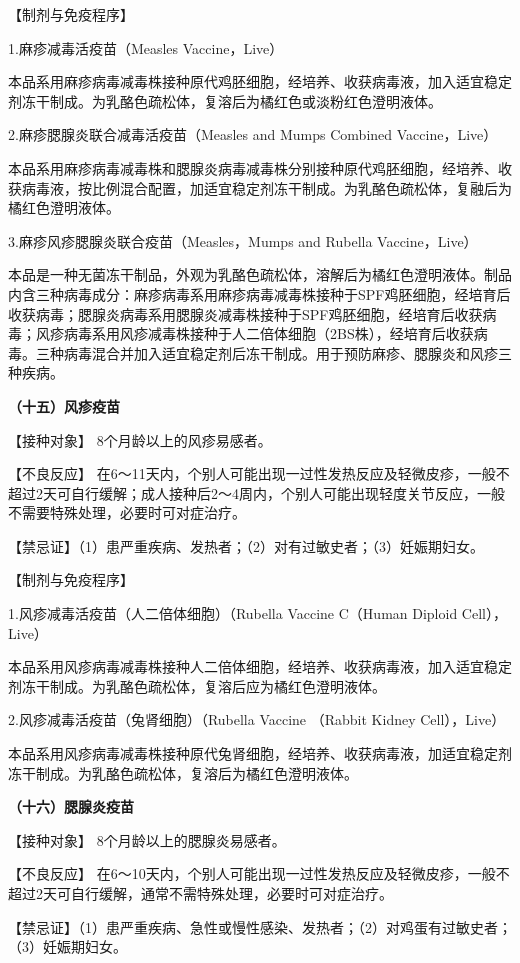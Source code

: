 【制剂与免疫程序】

1.麻疹减毒活疫苗（Measles Vaccine，Live）

本品系用麻疹病毒减毒株接种原代鸡胚细胞，经培养、收获病毒液，加入适宜稳定剂冻干制成。为乳酪色疏松体，复溶后为橘红色或淡粉红色澄明液体。

2.麻疹腮腺炎联合减毒活疫苗（Measles and Mumps Combined Vaccine，Live）

本品系用麻疹病毒减毒株和腮腺炎病毒减毒株分别接种原代鸡胚细胞，经培养、收获病毒液，按比例混合配置，加适宜稳定剂冻干制成。为乳酪色疏松体，复融后为橘红色澄明液体。

3.麻疹风疹腮腺炎联合疫苗（Measles，Mumps and Rubella Vaccine，Live）

本品是一种无菌冻干制品，外观为乳酪色疏松体，溶解后为橘红色澄明液体。制品内含三种病毒成分：麻疹病毒系用麻疹病毒减毒株接种于SPF鸡胚细胞，经培育后收获病毒；腮腺炎病毒系用腮腺炎减毒株接种于SPF鸡胚细胞，经培育后收获病毒；风疹病毒系用风疹减毒株接种于人二倍体细胞（2BS株），经培育后收获病毒。三种病毒混合并加入适宜稳定剂后冻干制成。用于预防麻疹、腮腺炎和风疹三种疾病。

\textbf{（十五）风疹疫苗}

【接种对象】 8个月龄以上的风疹易感者。

【不良反应】
在6～11天内，个别人可能出现一过性发热反应及轻微皮疹，一般不超过2天可自行缓解；成人接种后2～4周内，个别人可能出现轻度关节反应，一般不需要特殊处理，必要时可对症治疗。

【禁忌证】（1）患严重疾病、发热者；（2）对有过敏史者；（3）妊娠期妇女。

【制剂与免疫程序】

1.风疹减毒活疫苗（人二倍体细胞）（Rubella Vaccine C（Human Diploid
Cell），Live）

本品系用风疹病毒减毒株接种人二倍体细胞，经培养、收获病毒液，加入适宜稳定剂冻干制成。为乳酪色疏松体，复溶后应为橘红色澄明液体。

2.风疹减毒活疫苗（兔肾细胞）（Rubella Vaccine （Rabbit Kidney
Cell），Live）

本品系用风疹病毒减毒株接种原代兔肾细胞，经培养、收获病毒液，加适宜稳定剂冻干制成。为乳酪色疏松体，复溶后为橘红色澄明液体。

\textbf{（十六）腮腺炎疫苗}

【接种对象】 8个月龄以上的腮腺炎易感者。

【不良反应】
在6～10天内，个别人可能出现一过性发热反应及轻微皮疹，一般不超过2天可自行缓解，通常不需特殊处理，必要时可对症治疗。

【禁忌证】（1）患严重疾病、急性或慢性感染、发热者；（2）对鸡蛋有过敏史者；（3）妊娠期妇女。

